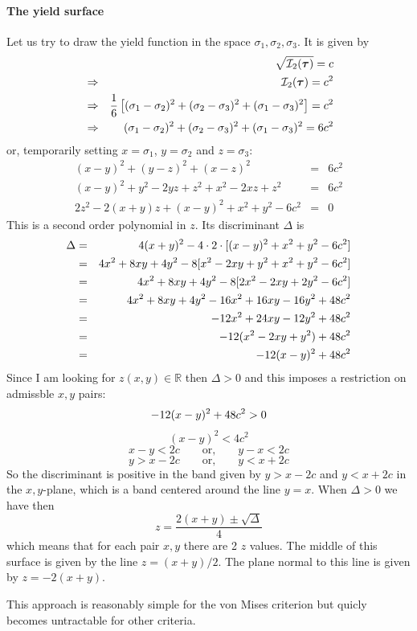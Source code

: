 \paragraph{The yield surface} Let us try to draw the yield function in 
the space $\sigma_1,\sigma_2,\sigma_3$. It is given by
\begin{eqnarray}
&&\sqrt{ {\cal I}_2({\bm \tau}) } = c \\
&\Rightarrow&  {\cal I}_2({\bm \tau})  = c^2 \\
&\Rightarrow& \frac{1}{6}\left[(\sigma_{1}-\sigma_{2})^2 + (\sigma_{2}-\sigma_{3})^2 
+ (\sigma_{1}-\sigma_{3})^2 \right] =c^2 \\
&\Rightarrow & (\sigma_{1}-\sigma_{2})^2 + (\sigma_{2}-\sigma_{3})^2 + (\sigma_{1}-\sigma_{3})^2 = 6c^2 
\end{eqnarray}
or, temporarily setting $x=\sigma_1$, $y=\sigma_2$ and $z=\sigma_3$: 
\begin{eqnarray}
(x-y)^2 + (y-z)^2 + (x-z)^2 &=& 6c^2 \\
(x-y)^2 + y^2 - 2yz + z^2 + x^2 -2xz +z^2 &=& 6c^2\\
2z^2 - 2(x+y)z + (x-y)^2+x^2+y^2-6c^2 &=& 0
\end{eqnarray}
This is a second order polynomial in $z$. Its discriminant $\Delta$ is
\begin{eqnarray}
\Delta 
&=& 4(x+y)^2 - 4 \cdot 2 \cdot [(x-y)^2+x^2+y^2-6c^2] \nonumber\\
&=& 4x^2 + 8xy + 4y^2 - 8 [x^2-2xy+y^2 +x^2+y^2-6c^2] \nonumber\\
&=& 4x^2 + 8xy + 4y^2 - 8 [2x^2-2xy+2y^2 -6c^2] \nonumber\\
&=& 4x^2 + 8xy + 4y^2 - 16x^2+ 16xy -16y^2 +48 c^2 \nonumber\\
&=& -12x^2 + 24xy -12 y^2  +48 c^2 \nonumber\\
&=& -12(x^2 -2xy + y^2)  + 48 c^2 \nonumber\\
&=& -12(x-y)^2  + 48 c^2 \nonumber
\end{eqnarray}
Since I am looking for $z(x,y)\in \mathbb{R}$ then $\Delta >0$ and this 
imposes a restriction on admissble $x,y$ pairs:
\[
 -12(x-y)^2  + 48 c^2 \nonumber > 0
\]
\[
(x-y)^2  < 4 c^2 
\]
\[
x-y<2c   
\qquad
\text{or,}
\qquad
y-x<2c   
\]
\[
y> x-2c   
\qquad
\text{or,}
\qquad
y<x+2c
\]
So the discriminant is positive in the band given by $y>x-2c$ and $y<x+2c$ in the $x,y$-plane, 
which is a band centered around the line $y=x$.
When $\Delta>0$ we have then 
\[
z= \frac{2(x+y) \pm \sqrt{\Delta}}{4}
\]
which means that for each pair $x,y$ there are 2 $z$ values. 
The middle of this surface is given by the line $z=(x+y)/2$. 
The plane normal to this line is given by $z=-2(x+y)$.

This approach is reasonably simple for the von Mises criterion but 
quicly becomes untractable for other criteria.

\newpage
